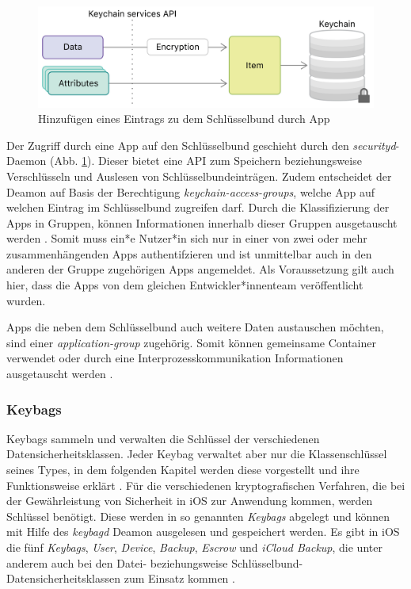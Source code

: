 \begin{figure}[h]
	\centering
  		\includegraphics[width=1\textwidth]{../images/keychain-api-example}
		\caption{Hinzufügen eines Eintrags zu dem Schlüsselbund durch App \cite{apple2020keychain_items}}
		\label{fig:add-entry-to-keychain}
\end{figure}

Der Zugriff durch eine App auf den Schlüsselbund geschieht durch den
\textit{securityd}-Daemon (Abb. \ref{fig:add-entry-to-keychain}). Dieser bietet
eine API zum Speichern beziehungsweise Verschlüsseln und Auslesen von
Schlüsselbundeinträgen. Zudem  entscheidet der Deamon auf Basis der Berechtigung
\textit{keychain-access-groups}, welche App auf welchen Eintrag im Schlüsselbund
zugreifen darf. Durch die Klassifizierung der Apps in Gruppen, können
Informationen innerhalb dieser Gruppen ausgetauscht werden
\cite{apple2020keychain_item_groups}. Somit muss ein*e Nutzer*in sich nur in
einer von zwei oder mehr zusammenhängenden Apps authentifzieren und ist
unmittelbar auch in den anderen der Gruppe zugehörigen Apps angemeldet. Als
Voraussetzung gilt auch hier, dass die Apps von dem gleichen
Entwickler*innenteam veröffentlicht wurden.

Apps die neben dem Schlüsselbund auch weitere Daten austauschen möchten, sind
einer \textit{application-group} zugehörig.  Somit können gemeinsame Container
verwendet oder durch eine Interprozesskommunikation Informationen ausgetauscht
werden \cite{apple2020keychain_application_groups}. 

\subsubsection{Keybags}
Keybags sammeln und verwalten die Schlüssel der verschiedenen
Datensicherheitsklassen. Jeder Keybag verwaltet aber nur die Klassenschlüssel
seines Types, in dem folgenden Kapitel werden diese vorgestellt und ihre
Funktionsweise erklärt \cite{apple2020}.  Für die verschiedenen kryptografischen
Verfahren, die bei der Gewährleistung von Sicherheit in iOS zur Anwendung
kommen, werden Schlüssel benötigt. Diese werden in so genannten \textit{Keybags}
abgelegt und können mit Hilfe des \textit{keybagd} Deamon ausgelesen und
gespeichert werden.  Es gibt in iOS die fünf \textit{Keybags}, \textit{User},
\textit{Device}, \textit{Backup}, \textit{Escrow} und \textit{iCloud Backup},
die unter anderem auch bei den Datei- beziehungsweise
Schlüsselbund-Datensicherheitsklassen zum Einsatz kommen \cite{apple2020}.

